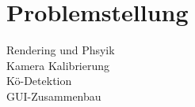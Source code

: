 
\chapter{Problemstellung}

Rendering und Phsyik \\
Kamera Kalibrierung \\
Kö-Detektion \\
GUI-Zusammenbau \\

